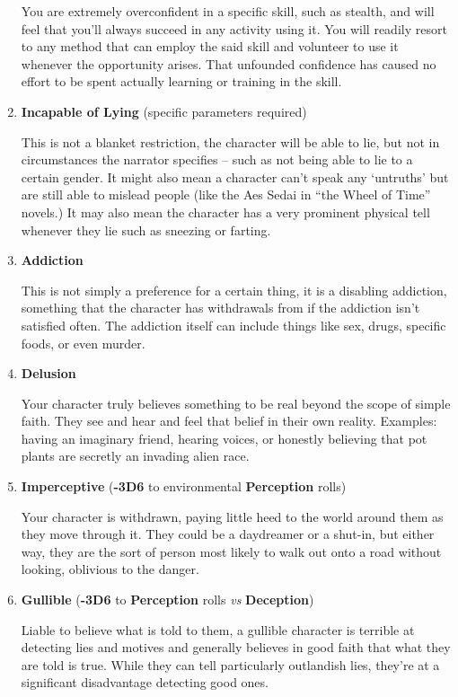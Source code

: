 \begin{enumerate}
    You are extremely overconfident in a specific skill, such as stealth, and will feel that you’ll always succeed in any activity using it. You will readily resort to any method that can employ the said skill and volunteer to use it whenever the opportunity arises. That unfounded confidence has caused no effort to be spent actually learning or training in the skill.

    \item \textbf{Incapable of Lying} (specific parameters required)
    
    This is not a blanket restriction, the character will be able to lie, but not in circumstances the narrator specifies – such as not being able to lie to a certain gender. It might also mean a character can’t speak any ‘untruths’ but are still able to mislead people (like the Aes Sedai in “the Wheel of Time” novels.) It may also mean the character has a very prominent physical tell whenever they lie such as sneezing or farting.

    \item \textbf{Addiction} 
    
    This is not simply a preference for a certain thing, it is a disabling addiction, something that the character has withdrawals from if the addiction isn’t satisfied often. The addiction itself can include things like sex, drugs, specific foods, or even murder.

    \item \textbf{Delusion}
    
    Your character truly believes something to be real beyond the scope of simple faith. They see and hear and feel that belief in their own reality. Examples: having an imaginary friend, hearing voices, or honestly believing that pot plants are secretly an invading alien race.

    \item \textbf{Imperceptive} (\textbf{-3D6} to environmental \textbf{Perception} rolls)
    
    Your character is withdrawn, paying little heed to the world around them as they move through it. They could be a daydreamer or a shut-in, but either way, they are the sort of person most likely to walk out onto a road without looking, oblivious to the danger.

    \item \textbf{Gullible} (\textbf{-3D6} to \textbf{Perception} rolls \textit{vs} \textbf{Deception})
    
    Liable to believe what is told to them, a gullible character is terrible at detecting lies and motives and generally believes in good faith that what they are told is true. While they can tell particularly outlandish lies, they’re at a significant disadvantage detecting good ones.


\end{enumerate}

